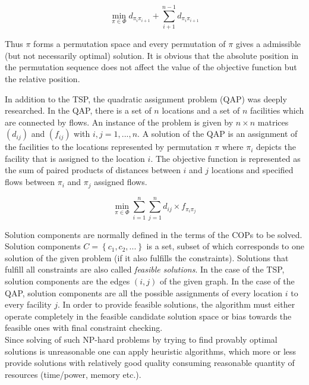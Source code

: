 \begin{equation}
\min \limits_{\pi \in \Phi} {d_{\pi_i \pi_{i+1}}} + \sum \limits_{i+1}^{n-1} {d_{\pi_i \pi_{i+1}}}
\end{equation}

Thus $\pi$ forms a permutation space and every permutation of $\pi$ gives a admissible (but not necessarily optimal) solution. It is obvious that the absolute position in the permutation sequence does not affect the value of the objective function but the relative position.

In addition to the TSP, the quadratic assignment problem (QAP) was deeply researched. In the QAP, there is a set of $n$ locations and a set of $n$ facilities which are connected by flows. An instance of the problem is given by $n \times n$ matrices $(d_{ij})$ and $(f_{ij})$ with $i, j = 1,...,n$. A solution of the QAP is an assignment of the facilities to the locations represented by permutation $\pi$ where $\pi_i$ depicts the facility that is assigned to the location $i$. The objective function is represented as the sum of paired products of distances between $i$ and $j$ locations and specified flows between $\pi_i$ and $\pi_j$ assigned flows.

\begin{equation}
\min \limits_{\pi \in \Phi} \sum \limits_{i=1}^n \sum \limits_{j=1}^n {d_{ij} \times f_{\pi_i \pi_j}}
\end{equation}

Solution components are normally defined in the terms of the COPs to be solved. Solution components $C=\left\{c_1,c_2,...\right\}$ is a set, subset of which corresponds to one solution of the given problem (if it also fulfills the constraints). Solutions that fulfill all constraints are also called \emph{feasible solutions}. In the case of the TSP, solution components are the edges $(i,j)$ of the given graph. In the case of the QAP, solution components are all the possible assignments of every location $i$ to every facility $j$. In order to provide feasible solutions, the algorithm must either operate completely in the feasible candidate solution space or bias towards the feasible ones with final constraint checking. \\

Since solving of such NP-hard problems by trying to find provably optimal solutions is unreasonable one can apply heuristic algorithms, which more or less provide solutions with relatively good quality consuming reasonable quantity of resources (time/power, memory etc.). \\

